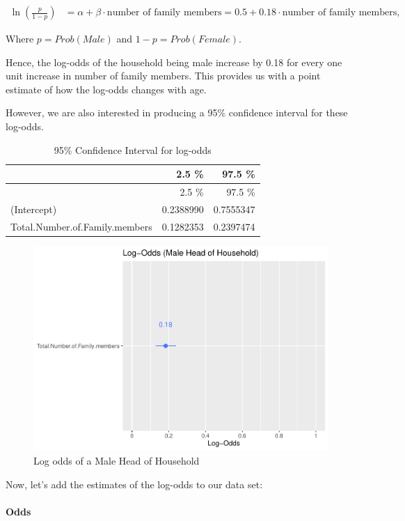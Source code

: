 \documentclass[
]{article}
\begin{document}
\begin{align} \ln\left(\frac{p}{1-p}\right) &= \alpha + \beta \cdot \textrm{number of family members} = 0.5 + 0.18 \cdot 
\textrm{number of family members}, \nonumber \end{align}

Where \(p = Prob(Male)\) and \(1-p = Prob(Female)\).

Hence, the log-odds of the household being male increase by 0.18 for
every one unit increase in number of family members. This provides us
with a point estimate of how the log-odds changes with age.

However, we are also interested in producing a 95\% confidence interval
for these log-odds.

\begin{longtable}[]{@{}lrr@{}}
\caption{95\% Confidence Interval for log-odds}\tabularnewline
\toprule
& 2.5 \% & 97.5 \%\tabularnewline
\midrule
\endfirsthead
\toprule
& 2.5 \% & 97.5 \%\tabularnewline
\midrule
\endhead
(Intercept) & 0.2388990 & 0.7555347\tabularnewline
Total.Number.of.Family.members & 0.1282353 & 0.2397474\tabularnewline
\bottomrule
\end{longtable}

\begin{figure}[H]

{\centering \includegraphics[width=0.8\linewidth]{Group_01_Project2_demo_files/figure-latex/plot of model-1} 

}

\caption{Log odds of a Male Head of Household}\label{fig:plot of model}
\end{figure}

Now, let's add the estimates of the log-odds to our data set:

\hypertarget{odds}{%
\paragraph{Odds}\label{odds}}
\end{document}
